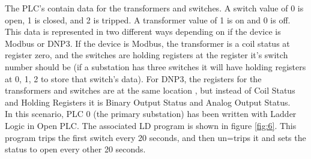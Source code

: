 \documentclass[11pt,a4paper,oldfontcommands]{memoir}
\begin{document}
\indent
The PLC's contain data for the transformers and switches. A switch value of 0 is open,
1 is closed, and 2 is tripped. A transformer value of 1 is on and 0 is off.
This data is represented in
two different ways depending on if the device is Modbus or DNP3. If the device is 
Modbus, the transformer is a coil status at register zero, and the switches are 
holding registers at the register it's switch number should be (if a substation
has three switches it will have holding registers at 0, 1, 2 to store that switch's 
data). For DNP3, the registers for the transformers and switches are at the same location
, but instead of Coil Status and Holding Registers it is Binary Output Status
and Analog Output Status. \\

\indent
In this scenario, PLC 0 (the primary substation) has been written with Ladder Logic
in Open PLC. The associated LD program is shown in figure \ref{fig:6}. This program
trips the first switch every 20 seconds, and then un=trips it and sets the status
to open every other 20 seconds. \\


\appendix





\end{document}
